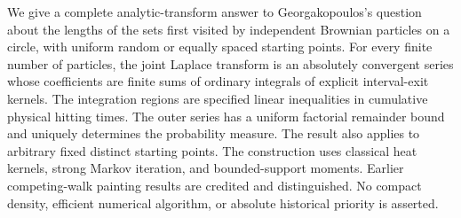 We give a complete analytic-transform answer to Georgakopoulos's
question about the lengths of the sets first visited by independent
Brownian particles on a circle, with uniform random or equally spaced
starting points. For every finite number of particles, the joint
Laplace transform is an absolutely convergent series whose coefficients
are finite sums of ordinary integrals of explicit interval-exit kernels.
The integration regions are specified linear inequalities in cumulative
physical hitting times. The outer series has a uniform factorial
remainder bound and uniquely determines the probability measure.
The result also applies to arbitrary fixed distinct starting points.
The construction uses classical heat kernels, strong Markov iteration,
and bounded-support moments. Earlier competing-walk painting results
are credited and distinguished. No compact density, efficient numerical
algorithm, or absolute historical priority is asserted.
